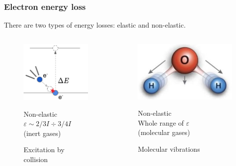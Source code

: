 \documentclass{beamer}
\begin{document}
	\begin{frame}
		\frametitle{Electron energy loss}
		
		There are two types of energy losses: elastic and non-elastic.
		
		\begin{columns}[t]
			\begin{figure}
				\centering
				\includegraphics[width=0.8\linewidth]{res/excitation.png}
				\caption*{Excitation by collision}
				
				Non-elastic\\
				$\varepsilon \sim 2/3I \div 3/4I$\\
				(inert gases)
			\end{figure}
			
			\vspace{10pt}
			\begin{figure}
				\centering
				\includegraphics[width=1.0\linewidth]{res/vibrations.jpg}
				\caption*{Molecular vibrations}
				Non-elastic\\
				Whole range of $\varepsilon$\\
				(molecular gases)
			\end{figure}
			

\end{columns}
\end{frame}
\end{document}
